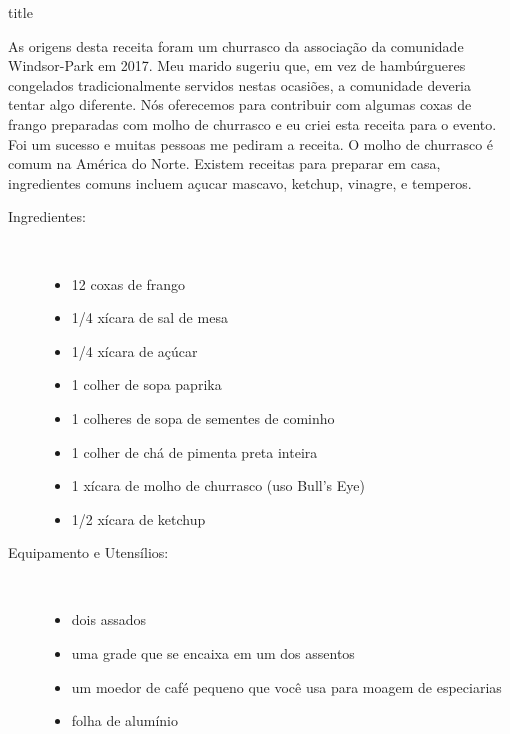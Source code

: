 \documentclass [11pt, letterpaper] {article}
\begin{document}
 {title}

As origens desta receita foram um churrasco da associa\c{c}\~ao da comunidade Windsor-Park em 2017. Meu marido sugeriu que, em vez de hambúrgueres congelados tradicionalmente servidos nestas ocasi\~oes, a comunidade deveria tentar algo diferente. Nós oferecemos para contribuir com algumas coxas de frango preparadas com molho de churrasco e eu criei esta receita para o evento. Foi um sucesso e muitas pessoas me pediram a receita. O molho de churrasco \'e comum na Am\'erica do Norte. Existem receitas para preparar em casa, ingredientes comuns incluem a\c{c}ucar mascavo, ketchup, vinagre, e temperos.

\begin {description}

\item [Ingredientes:] \ \\
\begin {itemize}
\item 12 coxas de frango
\item 1/4 xícara de sal de mesa
\item 1/4 xícara de açúcar
\item 1 colher de sopa paprika
\item 1 colheres de sopa de sementes de cominho
\item 1 colher de chá de pimenta preta inteira
\item 1 xícara de molho de churrasco (uso Bull's Eye)
\item 1/2 xícara de ketchup
\end {itemize}
\item [Equipamento e Utens\'ilios:] \ \\
\begin {itemize}
\item dois assados
\item uma grade que se encaixa em um dos assentos
\item um moedor de café pequeno que você usa para moagem de especiarias
\item folha de alumínio
\end {itemize}


\end{description}
\end{document}
